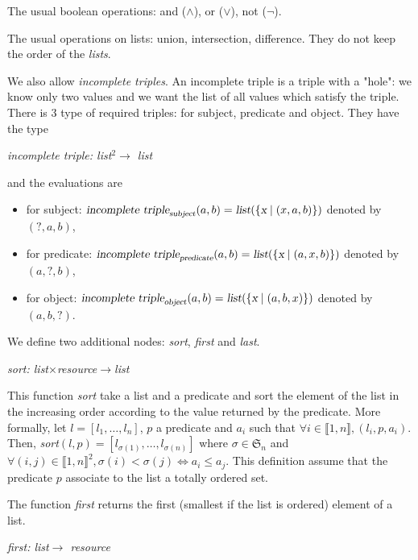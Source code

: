 The usual boolean operations: and ($\wedge$), or ($\vee$), not ($\neg$).

\bigskip

The usual operations on lists: union, intersection, difference. They do not keep the order of the \textsl{lists}.

We also allow \textsl{incomplete triples}. An incomplete triple is a triple with a "hole": we know only two values and we want the list of all values which satisfy the triple. There is 3 type of required triples: for subject, predicate and object. They have the type
\begin{center}
\textsl{incomplete triple: list$^2\rightarrow$ list}
\end{center}
and the evaluations are
\begin{itemize}
    \item for subject: $\textsl{incomplete triple}_{\textsl{subject}}(a,b) = \textsl{list}(\{\textsl{x}\mid(x,a,b)\})$ denoted by $(?,a,b)$,
    \item for predicate: $\textsl{incomplete triple}_{\textsl{predicate}}(a,b) = \textsl{list}(\{\textsl{x}\mid(a,x,b)\})$ denoted by $(a,?,b)$,
    \item for object: $\textsl{incomplete triple}_{\textsl{object}}(a,b) = \textsl{list}(\{\textsl{x}\mid(a,b,x)\})$ denoted by $(a,b,?)$.
\end{itemize}

We define two additional nodes: \textsl{sort}, \textsl{first} and \textsl{last}.

\begin{center}
\textsl{sort: list$\times$resource$\rightarrow$list}
\end{center}
This function \textsl{sort} take a list and a predicate and sort the element of the list in the increasing order according to the value returned by the predicate. More formally, let $l=[l_1,\ldots,l_n]$, $p$ a predicate and $a_i$ such that $\forall i\in\llbracket1,n\rrbracket, (l_i,p,a_i)$. Then, \textsl{sort}$(l,p) = [l_{\sigma(1)},\ldots,l_{\sigma(n)}]$ where $\sigma\in\mathfrak{S}_n$ and $\forall (i,j)\in\llbracket 1,n\rrbracket^2, \sigma(i)<\sigma(j) \Leftrightarrow a_i \leqslant a_j$. This definition assume that the predicate $p$ associate to the list a totally ordered set.

The function \textsl{first} returns the first (smallest if the list is ordered) element of a list.

\begin{center}
\textsl{first: list$\rightarrow$ resource}
\end{center}


